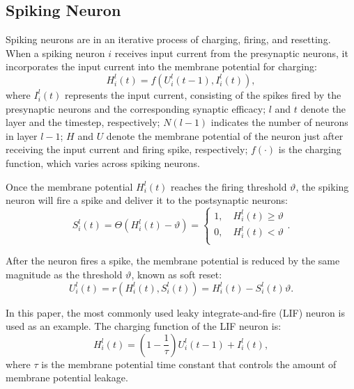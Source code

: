 \documentclass[letterpaper]{article} %
\begin{document}
\subsection{Spiking Neuron}
Spiking neurons are in an iterative process of charging, firing, and resetting. When a spiking neuron $i$ receives input current from the presynaptic neurons, it incorporates the input current into the membrane potential for charging:
\begin{equation}
H_{i}^{l}(t) = f(U_{i}^{l}(t-1),I_{i}^{l}(t)),
\label{eq1}
\end{equation}
where $I_{i}^{l}(t)$ represents the input current, consisting of the spikes fired by the presynaptic neurons and the corresponding synaptic efficacy; $l$ and $t$ denote the layer and the timestep, respectively; $N(l-1)$ indicates the number of neurons in layer $l-1$; $H$ and $U$ denote the membrane potential of the neuron just after receiving the input current and firing spike, respectively; $f(\cdot)$ is the charging function, which varies across spiking neurons.

Once the membrane potential $H_{i}^{l}(t)$ reaches the firing threshold $\vartheta$, the spiking neuron will fire a spike and deliver it to the postsynaptic neurons:
\begin{equation}
S_{i}^{l}(t) = \Theta(H_{i}^{l}(t)-\vartheta)=\left\{
\begin{array}{cl}
1,\quad H_{i}^{l}(t) \ge \vartheta \\
0,\quad H_{i}^{l}(t) < \vartheta \\
\end{array}.
\right.
\label{eq2}
\end{equation}

After the neuron fires a spike, the membrane potential is reduced by the same magnitude as the threshold $\vartheta$, known as soft reset:
\begin{equation}
U_{i}^{l}(t) = r(H_{i}^{l}(t),S_{i}^{l}(t))=H_{i}^{l}(t)-S_{i}^{l}(t)\vartheta.
\label{eq4}
\end{equation}

In this paper, the most commonly used leaky integrate-and-fire (LIF) \cite{MLF} neuron is used as an example. The charging function of the LIF neuron is:
\begin{equation}
H_{i}^{l}(t)=\left(1-\frac{1}{\tau}\right) U_{i}^{l}(t-1)+I_{i}^{l}(t),
\label{eq5}
\end{equation}
where $\tau$ is the membrane potential time constant that controls the amount of membrane potential leakage.
\end{document}
